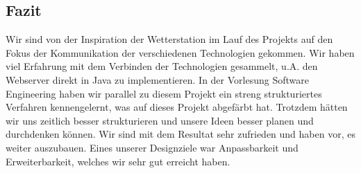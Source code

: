 \documentclass[11pt,a4paper]{article}
\begin{document}
\subsection{Fazit}
Wir sind von der Inspiration der Wetterstation im Lauf des Projekts auf den Fokus der Kommunikation der verschiedenen Technologien gekommen. Wir haben viel Erfahrung mit dem Verbinden der Technologien gesammelt, u.A. den Webserver direkt in Java zu implementieren. In der Vorlesung Software Engineering haben wir parallel zu diesem Projekt ein streng strukturiertes Verfahren kennengelernt, was auf dieses Projekt abgefärbt hat. Trotzdem hätten wir uns zeitlich besser strukturieren und unsere Ideen besser planen und durchdenken können.
Wir sind mit dem Resultat sehr zufrieden und haben vor, es weiter auszubauen. Eines unserer Designziele war Anpassbarkeit und Erweiterbarkeit, welches wir sehr gut erreicht haben.



\end{document}
